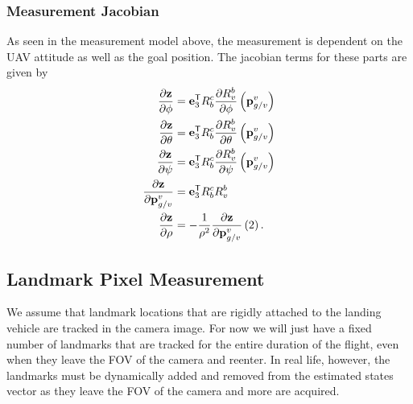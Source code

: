 \subsubsection{Measurement Jacobian}
As seen in the measurement model above, the measurement is dependent on the UAV
attitude as well as the goal position. The jacobian terms for these parts are
given by
\begin{align}
  \frac{\partial \boldsymbol{\mathrm{z}}}{\partial \phi} &= \boldsymbol{\mathrm{e}}_3^{\mathsf{T}} R_b^c \frac{
    \partial R_v^b}{\partial \phi} \left( \boldsymbol{\mathrm{p}}_{g/v}^v \right) \\
  \frac{\partial \boldsymbol{\mathrm{z}}}{\partial \theta} &= \boldsymbol{\mathrm{e}}_3^{\mathsf{T}} R_b^c \frac{
    \partial R_v^b}{\partial \theta} \left( \boldsymbol{\mathrm{p}}_{g/v}^v \right) \\
  \frac{\partial \boldsymbol{\mathrm{z}}}{\partial \psi} &= \boldsymbol{\mathrm{e}}_3^{\mathsf{T}} R_b^c \frac{
    \partial R_v^b}{\partial \psi} \left( \boldsymbol{\mathrm{p}}_{g/v}^v \right) \\
    \frac{\partial \boldsymbol{\mathrm{z}}}{\partial \boldsymbol{\mathrm{p}}_{g/v}^v} &= \boldsymbol{\mathrm{e}}_3^{\mathsf{T}} R_b^c
    R_v^b \\
  \frac{\partial \boldsymbol{\mathrm{z}}}{\partial \rho} &= -\frac{1}{\rho^2}
    \frac{\partial \boldsymbol{\mathrm{z}}}{\partial \boldsymbol{\mathrm{p}}_{g/v}^v}\left(2\right).
\end{align}

\subsection{Landmark Pixel Measurement}
We assume that landmark locations that are rigidly attached to the landing
vehicle are tracked in the camera image. For now we will just have a fixed
number of landmarks that are tracked for the entire duration of the flight, even
when they leave the FOV of the camera and reenter. In real life, however, the
landmarks must be dynamically added and removed from the estimated states vector
as they leave the FOV of the camera and more are acquired.

